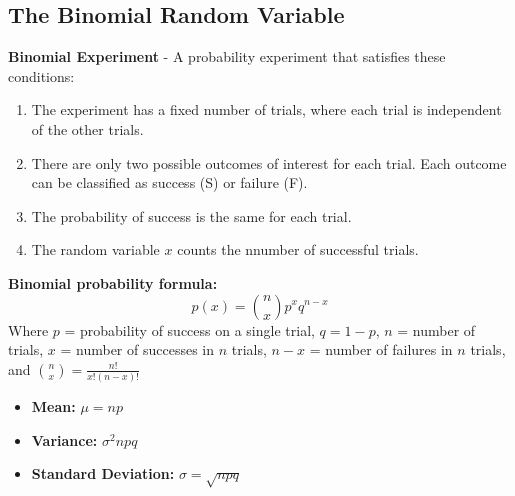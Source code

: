 \documentclass[a4paper]{article}
\let\bf\textbf
\begin{document}
\subsection{The Binomial Random Variable}
\bf{Binomial Experiment} - A probability experiment that satisfies these conditions:
\begin{enumerate}
    \item The experiment has a fixed number of trials, where each trial is independent of the other trials.
    \item There are only two possible outcomes of interest for each trial. Each outcome can be classified as success (S) or failure (F).
    \item The probability of success is the same for each trial.
    \item The random variable $x$ counts the nnumber of successful trials.
\end{enumerate}
\bf{Binomial probability formula:}
\begin{equation}
    p(x) = \binom{n}{x}p^xq^{n-x}
\end{equation}
Where $p$ = probability of success on a single trial, $q = 1 - p$, $n$ = number of trials, $x$ = number of successes in $n$ trials, $n - x$ = number of failures in $n$ trials, and $\displaystyle\binom{n}{x} = \frac{n!}{x!(n-x)!}$
\begin{itemize}
    \item \bf{Mean:} $\displaystyle \mu = np$
    \item \bf{Variance:} $\displaystyle \sigma^2 npq$
    \item \bf{Standard Deviation:} $\displaystyle \sigma = \sqrt{npq}$
\end{itemize}
\end{document}

